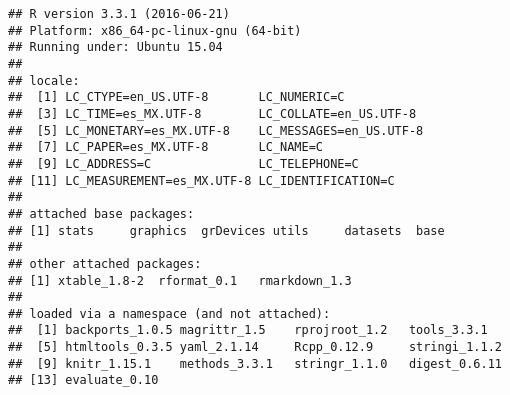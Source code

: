 \documentclass[]{article}
\begin{document}
\begin{verbatim}
## R version 3.3.1 (2016-06-21)
## Platform: x86_64-pc-linux-gnu (64-bit)
## Running under: Ubuntu 15.04
## 
## locale:
##  [1] LC_CTYPE=en_US.UTF-8       LC_NUMERIC=C              
##  [3] LC_TIME=es_MX.UTF-8        LC_COLLATE=en_US.UTF-8    
##  [5] LC_MONETARY=es_MX.UTF-8    LC_MESSAGES=en_US.UTF-8   
##  [7] LC_PAPER=es_MX.UTF-8       LC_NAME=C                 
##  [9] LC_ADDRESS=C               LC_TELEPHONE=C            
## [11] LC_MEASUREMENT=es_MX.UTF-8 LC_IDENTIFICATION=C       
## 
## attached base packages:
## [1] stats     graphics  grDevices utils     datasets  base     
## 
## other attached packages:
## [1] xtable_1.8-2  rformat_0.1   rmarkdown_1.3
## 
## loaded via a namespace (and not attached):
##  [1] backports_1.0.5 magrittr_1.5    rprojroot_1.2   tools_3.3.1    
##  [5] htmltools_0.3.5 yaml_2.1.14     Rcpp_0.12.9     stringi_1.1.2  
##  [9] knitr_1.15.1    methods_3.3.1   stringr_1.1.0   digest_0.6.11  
## [13] evaluate_0.10
\end{verbatim}
\end{document}

